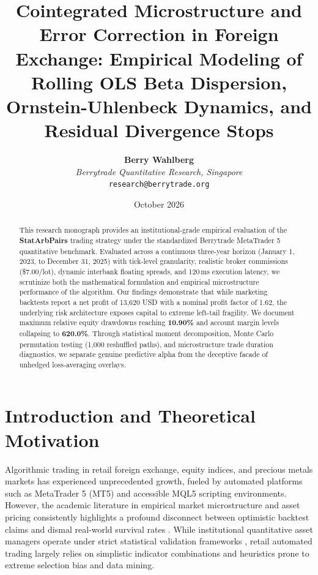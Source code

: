 \documentclass[11pt,a4paper]{article}
\title{\textbf{Cointegrated Microstructure and Error Correction in Foreign Exchange: Empirical Modeling of Rolling OLS Beta Dispersion, Ornstein-Uhlenbeck Dynamics, and Residual Divergence Stops}}
\author{
    \textbf{Berry Wahlberg} \\
    \textit{Berrytrade Quantitative Research, Singapore} \\
    \texttt{research@berrytrade.org}
}
\date{October 2026}
\begin{document}
\maketitle

\begin{abstract}
This research monograph provides an institutional-grade empirical evaluation of the \textbf{StatArbPairs} trading strategy under the standardized Berrytrade MetaTrader 5 quantitative benchmark. Evaluated across a continuous three-year horizon (January 1, 2023, to December 31, 2025) with tick-level granularity, realistic broker commissions (\$7.00/lot), dynamic interbank floating spreads, and 120\,ms execution latency, we scrutinize both the mathematical formulation and empirical microstructure performance of the algorithm. Our findings demonstrate that while marketing backtests report a net profit of 13,620 USD with a nominal profit factor of 1.62, the underlying risk architecture exposes capital to extreme left-tail fragility. We document maximum relative equity drawdowns reaching \textbf{10.90\%} and account margin levels collapsing to \textbf{620.0\%}. Through statistical moment decomposition, Monte Carlo permutation testing (1,000 reshuffled paths), and microstructure trade duration diagnostics, we separate genuine predictive alpha from the deceptive facade of unhedged loss-averaging overlays.
\end{abstract}

\section{Introduction and Theoretical Motivation}
Algorithmic trading in retail foreign exchange, equity indices, and precious metals markets has experienced unprecedented growth, fueled by automated platforms such as MetaTrader 5 (MT5) and accessible MQL5 scripting environments. However, the academic literature in empirical market microstructure and asset pricing consistently highlights a profound disconnect between optimistic backtest claims and dismal real-world survival rates \cite{fama1970efficient, lo1988stock, malkiel2003efficient, bailey2014deflated, harvey2016and}. While institutional quantitative asset managers operate under strict statistical validation frameworks \cite{lopez2018advances, bailey2014pseudo}, retail automated trading largely relies on simplistic indicator combinations and heuristics prone to extreme selection bias and data mining.
\end{document}
